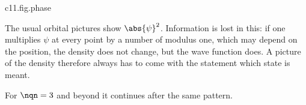 \begin{tpcfigure}{c11.fig.phase}
  \caption{Sign and phase of the 2p wave functions for $\Znuc = 1$; the grey values again
    show $\abs{\psi}^2$. Left $\psinlm{2}{1}{0}$ in the plane $y = 0$: the function is
    real, positive above, negative below. Right $\psinlm{2}{1}{1}$ in the plane $z = 0$:
    the modulus depends only on the distance from the centre, the phase
    $\arg\psinlm{2}{1}{1} = \phi + \pi$ only on the angle $\phi$; its value is written at
    the four rays, and the arrow shows in which direction it grows. For
    $\psinlm{2}{1}{-1}$ the phase runs the other way.}
\end{tpcfigure}

\begin{remark}
  The usual orbital pictures show $\abs{\psi}^2$. Information is lost in this: if one
  multiplies $\psi$ at every point by a number of modulus one, which may depend on the
  position, the density does not change, but the wave function does. A picture of the
  density therefore always has to come with the statement which state is meant.
\end{remark}

For $\nqn = 3$ and beyond it continues after the same pattern.

